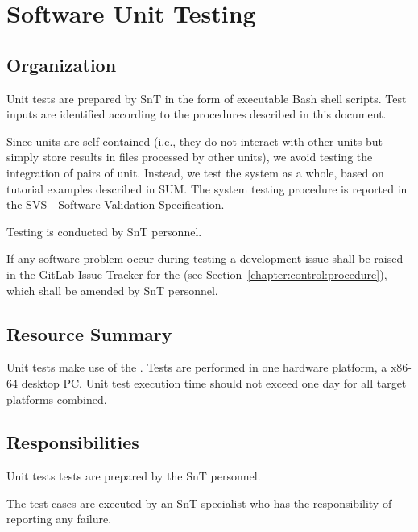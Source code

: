 
\chapter{Software Unit Testing}

\section{Organization}
\label{sec:SUTSIT:org}

Unit tests are prepared by SnT in the form of executable Bash shell scripts. Test inputs are identified according to the procedures described in this document.

Since units are self-contained (i.e., they do not interact with other units but simply store results in files processed by other units), we avoid testing the integration of pairs of unit. Instead, we test the system as a whole, based on tutorial examples described in SUM. The system testing procedure is reported in the SVS - Software Validation Specification.

Testing is conducted by SnT personnel.

If any software problem occur during testing a development issue shall be raised in the GitLab Issue Tracker for the \FAQAS (see Section~\ref{chapter:control:procedure}), which shall be amended by SnT personnel.



\section{Resource Summary}

Unit tests make use of the \FAQAS. Tests are performed in one hardware platform, a x86-64 desktop PC. Unit test execution time should not exceed one day for all target platforms combined.

\section{Responsibilities}

Unit tests tests are prepared by the SnT personnel.

The test cases are executed by an SnT specialist who has the responsibility of reporting any failure.


